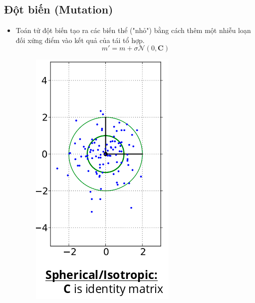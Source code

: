 \documentclass{book}
\begin{document}
\subsection{Đột biến (Mutation)}
\begin{itemize}
    \item Toán tử đột biến tạo ra các biến thể ("nhỏ") bằng cách thêm một nhiễu loạn đối xứng điểm vào kết quả của tái tổ hợp. 
    \begin{equation*}
        m'=m+\sigma\mathcal{N}(0,\mathbf{C})
    \end{equation*}
    \begin{figure}[H]
        \centering
        \begin{minipage}[c]{0.3\textwidth}
            \centering
            \includegraphics[width=\textwidth]{images/spherical_mutation.png}

\end{minipage}
\end{figure}
\end{itemize}
\end{document}
